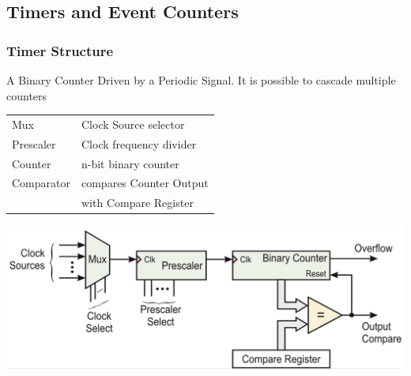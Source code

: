 \subsection{Timers and Event Counters }
\subsubsection{Timer Structure}
A Binary Counter Driven by a Periodic Signal. It is possible to cascade multiple counters\\
\vspace{1cm}
\begin{minipage}{0.5\linewidth}
	\begin{tabular}{ll}
		Mux           & Clock Source selector \\
		Prescaler     & Clock frequency divider \\
		Counter       & n-bit binary counter \\
		Comparator    & compares Counter Output\\
                      &  with Compare Register
	\end{tabular}
\end{minipage}
\begin{minipage}{0.5\linewidth}
	\includegraphics[width=\linewidth]{images/timerstructure.png} 
\end{minipage}

